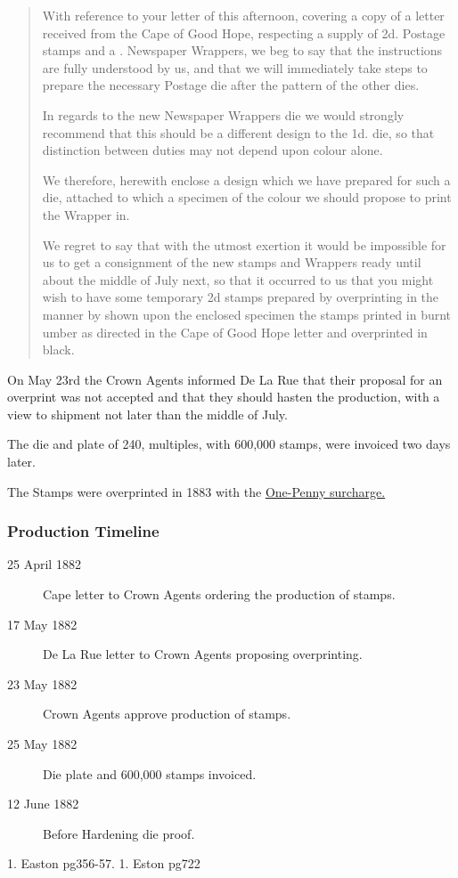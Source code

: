 \begin{quotation}
With reference to your letter of this afternoon, covering a copy of a letter received from the Cape of Good Hope, respecting a supply of 2d. Postage stamps and a \halfd. Newspaper Wrappers, we beg to say that the instructions are fully understood by us, and that we will immediately take steps to prepare the necessary Postage die after the pattern of the other dies.

In regards to the new Newspaper Wrappers die we would strongly recommend that this should be a different design to the 1d. die, so that distinction between duties may not depend upon colour alone.

We therefore, herewith enclose a design which we have prepared for such a die, attached to which a specimen of the colour we should propose to print the Wrapper in.

We regret to say that with the utmost exertion it would be impossible for us to get a consignment of the new stamps and Wrappers ready until about the middle of July next, so that it occurred to us that you might wish to have some temporary 2d stamps prepared by overprinting in the manner by shown upon the enclosed specimen the stamps printed in burnt umber as directed in the Cape of Good Hope letter and overprinted in black. 
\end{quotation}


On May 23rd the Crown Agents informed De La Rue that their proposal for an overprint was not accepted and that they should hasten the production, with a view to shipment not later than the middle of July.

The die and plate of 240, multiples, with 600,000 stamps, were invoiced two days later.

The Stamps were overprinted in 1883 with  the \href{../cape-of-good-hope/1893_One_penny_surcharge}{One-Penny surcharge.}



\subsubsection{Production Timeline}

\begin{description}
\item[25 April 1882] Cape letter to Crown Agents ordering the production of stamps.

\item[17 May 1882] De La Rue letter to Crown Agents proposing overprinting.

\item[23 May 1882] Crown Agents approve production of stamps.

\item[25 May 1882] Die plate and 600,000 stamps invoiced.

\item [12 June 1882] Before Hardening die proof.
\end{description}














1. Easton pg356-57. 
1. Eston pg722

              